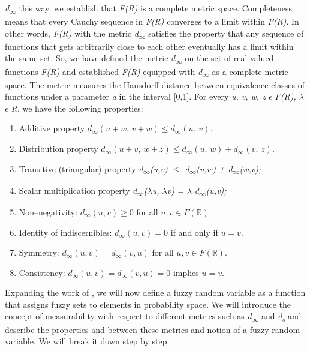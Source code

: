 \documentclass[12pt,a4paper]{report}
\numberwithin{equation}{section}
\begin{document}
\emph{d\textsubscript{$\infty$}} this way, we establish that \emph{F(R)} is a
complete metric space. Completeness means that every Cauchy sequence in
\emph{F(R)} converges to a limit within \emph{F(R)}. In other words,
\emph{F(R)} with the metric \emph{d\textsubscript{$\infty$}} satisfies the
property that any sequence of functions that gets arbitrarily close to
each other eventually has a limit within the same set. So, we have
defined the metric \emph{d\textsubscript{$\infty$}} on the set of real valued
functions \emph{F(R)} and established \emph{F(R)} equipped with
\emph{d\textsubscript{$\infty$}} as a complete metric space. The metric
measures the Hausdorff distance between equivalence classes of functions
under a parameter \emph{a} in the interval {[}0,1{]}. For every \emph{u,
v, w, z $\epsilon$ F(R), $\lambda$ $\epsilon$ R}, we have the following properties:

\begin{enumerate}
\def\labelenumi{\roman{enumi}.}
\item Additive property \emph{$d_{\infty}(u+w,\,v+w)\le d_{\infty}(u,\,v)$.}

\item Distribution property \emph{$d_{\infty}(u+v,\,w+z)\le d_{\infty}(u,\,w)+d_{\infty}(v,\,z)$.}

\item
  Transitive (triangular) property \emph{d\textsubscript{$\infty$}(u,v) $\leq$
  d\textsubscript{$\infty$}(u,w) + d\textsubscript{$\infty$}(w,v);}
\item
  Scalar multiplication property \emph{d\textsubscript{$\infty$}($\lambda$u, $\lambda$v) =
  \textbar $\lambda$\textbar{} d\textsubscript{$\infty$}(u,v);}
\item Non--negativity: \(d_{\infty}(u,v)\ge 0\) for all \(u,v\in F(\mathbb{R})\).
\item Identity of indiscernibles: \(d_{\infty}(u,v)=0\) if and only if \(u=v\).
\item Symmetry: \(d_{\infty}(u,v)=d_{\infty}(v,u)\) for all \(u,v\in F(\mathbb{R})\).
\item Consistency: \(d_{\infty}(u,v)=d_{\infty}(v,u)=0\) implies \(u=v\).
\end{enumerate}


Expanding the work of \cite{kolmogorov1940wienersche_76}, we will now define a fuzzy random
variable as a function that assigns fuzzy sets to elements in
probability space. We will introduce the concept of measurability with
respect to different metrics such as \emph{d\textsubscript{$\infty$}} and
\emph{d\textsubscript{s}} and describe the properties and between these
metrics and notion of a fuzzy random variable. We will break it down
step by step:
\end{document}
